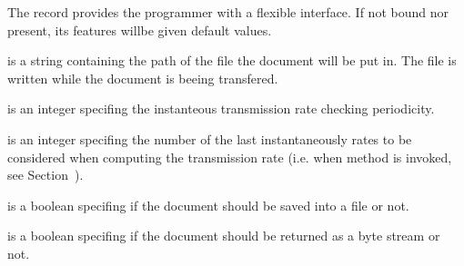 \documentclass{ozdoc}
\begin{document}
\begin{mozartDESCRIPTION}
\mozartENTRYHASCODE
\begin{mozartSYNOPSIS}
\begin{mozartCODEDISPLAY}\mozartFACETEXT{\mozartSPACE{}}\mozartFACEKEYWORD{\mozartLT{}=}\mozartFACETEXT{\mozartSPACE{}}\mozartFACEKEYWORD{\mozartLT{}=}\mozartFACETEXT{\mozartSPACE{}}\mozartFACEKEYWORD{\mozartLT{}=}\mozartFACETEXT{\mozartSPACE{}}\mozartFACEKEYWORD{\mozartLT{}=}\mozartFACETEXT{\mozartSPACE{}}\mozartFACETEXT{\mozartSPACE{}}\mozartFACEKEYWORD{\mozartLT{}=}\mozartFACETEXT{\mozartSPACE{}}\mozartFACETEXT{)}\end{mozartCODEDISPLAY}
\end{mozartSYNOPSIS}
\mozartITEM The  record provides the programmer with a flexible interface. If not bound nor present, its features willbe given default values.

 is a string containing the path of the file the document will be put in. The file is written while the document is beeing transfered.

 is an integer specifing the instanteous transmission rate checking periodicity.

 is an integer specifing the number of the last instantaneously rates to be considered when computing the transmission rate (i.e. when method  is invoked, see Section~).

 is a boolean specifing if the document should be saved into a file or not.

 is a boolean specifing if the document should be returned as a byte stream or not.  \mozartEMPTY
\end{mozartDESCRIPTION}
\end{document}
